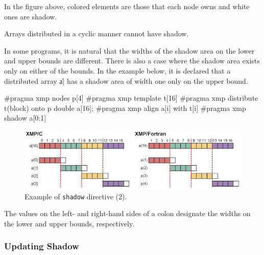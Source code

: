 In the figure above, colored elements are those that each node owns and
white ones are shadow.

\begin{mynote}
  Arrays distributed in a cyclic manner cannot have shadow.  
\end{mynote}


In some programs, it is natural that the widths of the shadow area on
the lower and upper bounds are different. There is also a case where the
shadow area exists only on either of the bounds. In the example below,
it is declared that a distributed array \|a| has a shadow area of width
one only on the upper bound.

\begin{XCexample}
#pragma xmp nodes p[4]
#pragma xmp template t[16]
#pragma xmp distribute t(block) onto p
double a[16];
#pragma xmp align a[i] with t[i]
#pragma xmp shadow a[0:1]
\end{XCexample}


\begin{figure}
  \centering
  \includegraphics[width=\textwidth]{figs/shadow_uneven.png}
  \caption{Example of {\tt shadow} directive (2).}
\end{figure}

The values on the left- and right-hand sides of a colon designate the
widths on the lower and upper bounds, respectively.

\subsubsection{Updating Shadow}

